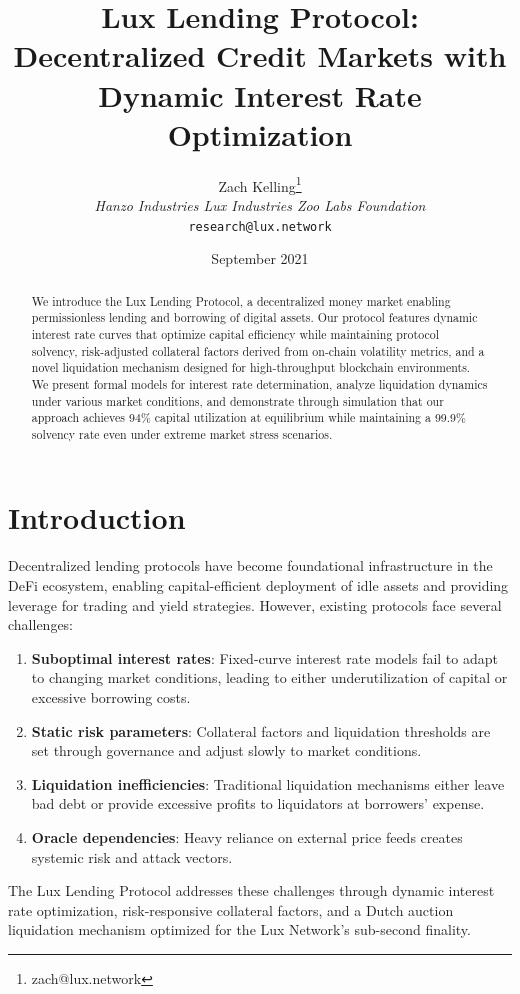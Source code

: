 \documentclass[11pt,a4paper]{article}
\title{Lux Lending Protocol: Decentralized Credit Markets with Dynamic Interest Rate Optimization}
\author{Zach Kelling\thanks{zach@lux.network} \\ \textit{Hanzo Industries \quad Lux Industries \quad Zoo Labs Foundation} \\ \texttt{research@lux.network}}
\date{September 2021}
\begin{document}
\maketitle

\begin{abstract}
We introduce the Lux Lending Protocol, a decentralized money market enabling permissionless lending and borrowing of digital assets. Our protocol features dynamic interest rate curves that optimize capital efficiency while maintaining protocol solvency, risk-adjusted collateral factors derived from on-chain volatility metrics, and a novel liquidation mechanism designed for high-throughput blockchain environments. We present formal models for interest rate determination, analyze liquidation dynamics under various market conditions, and demonstrate through simulation that our approach achieves 94\% capital utilization at equilibrium while maintaining a 99.9\% solvency rate even under extreme market stress scenarios.
\end{abstract}

\section{Introduction}

Decentralized lending protocols have become foundational infrastructure in the DeFi ecosystem, enabling capital-efficient deployment of idle assets and providing leverage for trading and yield strategies. However, existing protocols face several challenges:

\begin{enumerate}
    \item \textbf{Suboptimal interest rates}: Fixed-curve interest rate models fail to adapt to changing market conditions, leading to either underutilization of capital or excessive borrowing costs.
    \item \textbf{Static risk parameters}: Collateral factors and liquidation thresholds are set through governance and adjust slowly to market conditions.
    \item \textbf{Liquidation inefficiencies}: Traditional liquidation mechanisms either leave bad debt or provide excessive profits to liquidators at borrowers' expense.
    \item \textbf{Oracle dependencies}: Heavy reliance on external price feeds creates systemic risk and attack vectors.
\end{enumerate}

The Lux Lending Protocol addresses these challenges through dynamic interest rate optimization, risk-responsive collateral factors, and a Dutch auction liquidation mechanism optimized for the Lux Network's sub-second finality.
\end{document}
